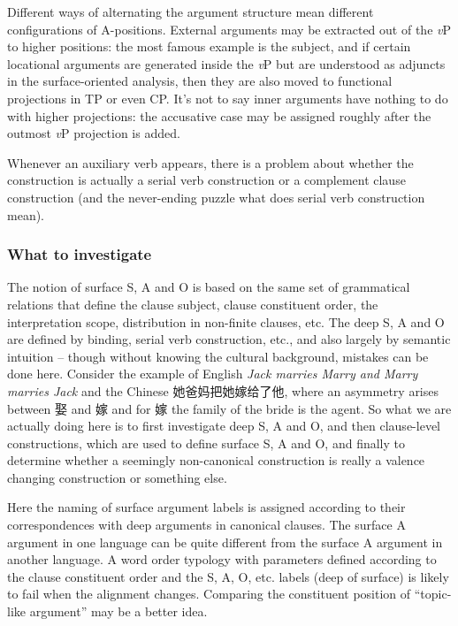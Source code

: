 \documentclass[UTF8, a4paper, oneside, scheme=plain]{ctexart}
\newcommand*{\corpus}[1]{\emph{#1}}
\newcommand*{\vP}{\textit{v}P}
\begin{document}
Different ways of alternating the argument structure mean 
different configurations of A-positions.
External arguments may be extracted out of the \vP{} to higher positions:
the most famous example is the subject,
and if certain locational arguments are generated inside the \vP{}
but are understood as adjuncts in the surface-oriented analysis,
then they are also moved to functional projections in TP or even CP.
It's not to say inner arguments have nothing to do with higher projections:
the accusative case may be assigned roughly after the outmost \vP{} projection is added.

Whenever an auxiliary verb appears,
there is a problem about whether the construction is actually a serial verb construction
or a complement clause construction 
(and the never-ending puzzle what does serial verb construction mean). %

\subsubsection{What to investigate}

The notion of surface S, A and O 
is based on the same set of grammatical relations that define 
the clause subject, clause constituent order, 
the interpretation scope, distribution in non-finite clauses, etc. 
The deep S, A and O are defined
by binding, serial verb construction, etc., 
and also largely by semantic intuition -- 
though without knowing the cultural background, mistakes can be done here.
Consider the example of English \corpus{Jack marries Marry and Marry marries Jack} 
and the Chinese 她爸妈把她嫁给了他, 
where an asymmetry arises between 娶 and 嫁 and for 嫁 the family of the bride is the agent.
So what we are actually doing here is to first investigate deep S, A and O, 
and then clause-level constructions, which are used to define surface S, A and O, 
and finally to determine whether a seemingly non-canonical construction 
is really a valence changing construction or something else.

Here the naming of surface argument labels is assigned 
according to their correspondences with deep arguments in canonical clauses.
The surface A argument in one language can be quite different from the surface A argument in another language.
A word order typology with parameters defined 
according to the clause constituent order 
and the S, A, O, etc. labels (deep of surface) 
is likely to fail when the alignment changes.
Comparing the constituent position of ``topic-like argument'' may be a better idea.
\end{document}
